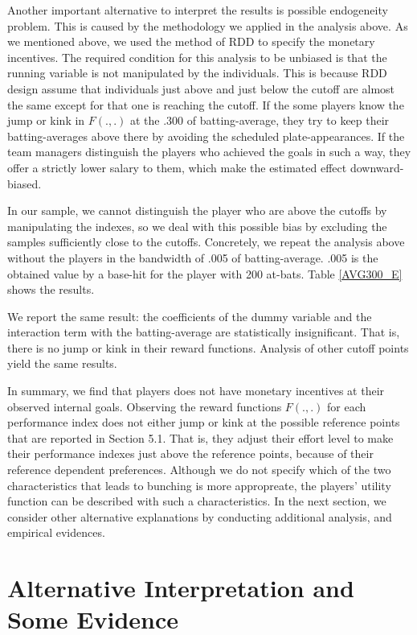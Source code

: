 \documentclass[dvipdfmx, 12pt]{article}
\begin{document}
Another important alternative to interpret the results is possible  endogeneity problem. This is caused by the methodology we applied in the analysis above. As we mentioned above, we used the method of RDD to specify the monetary incentives. The required condition for this analysis to be unbiased is that the running variable is not manipulated by the individuals. This is because RDD design assume that individuals just above and just below the cutoff are almost the same except for that one is reaching the cutoff. If the some players know the jump or kink in $F(.,.)$ at the .300 of batting-average, they try to keep their batting-averages above there by avoiding the scheduled plate-appearances. If the team managers distinguish the players who achieved the goals in such a way, they offer a strictly lower salary to them, which make the estimated effect downward-biased.

In our sample, we cannot distinguish the player who are above the cutoffs by manipulating the indexes, so we deal with this possible bias by excluding the samples sufficiently close to the cutoffs. Concretely, we repeat the analysis above without the players in the bandwidth of .005 of batting-average. .005 is the obtained value by a base-hit for the player with 200 at-bats. Table \ref{AVG300_E} shows the results.

We report the same result: the coefficients of the dummy variable and the interaction term with the batting-average are statistically insignificant. That is, there is no jump or kink in their reward functions. Analysis of other cutoff points yield the same results.

In summary, we find that players does not have monetary incentives at their observed internal goals. Observing the reward functions $F(.,.)$ for each performance index does not either jump or kink at the possible reference points that are reported in Section 5.1. That is, they adjust their effort level to make their performance indexes just above the reference points, because of their reference dependent preferences. Although we do not specify which of the two characteristics that leads to bunching is more appropreate, the players' utility function can be described with such a characteristics. In the next section, we consider other alternative explanations by conducting additional analysis, and empirical evidences.



\section{Alternative Interpretation and Some Evidence}
\end{document}
